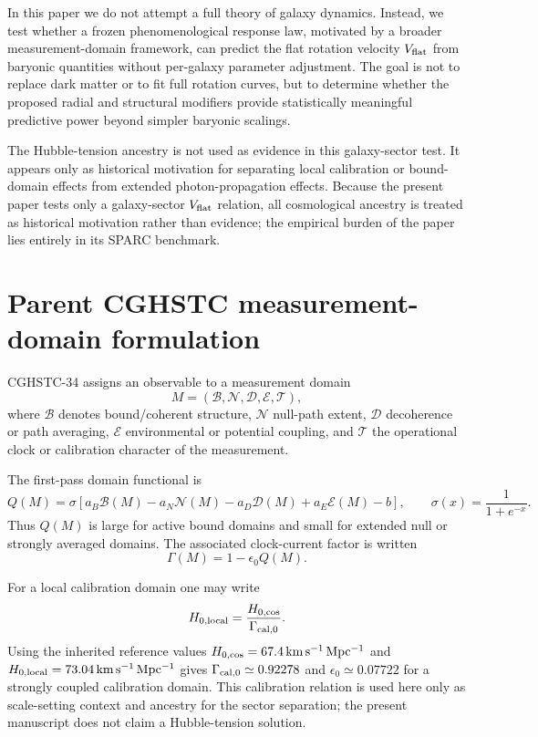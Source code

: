 \documentclass[aps,prd,preprint,nofootinbib,superscriptaddress]{revtex4-2}
\begin{document}
In this paper we do not attempt a full theory of galaxy dynamics. Instead, we test whether a frozen phenomenological response law, motivated by a broader measurement-domain framework, can predict the flat rotation velocity $V_{\rm flat}$ from baryonic quantities without per-galaxy parameter adjustment. The goal is not to replace dark matter or to fit full rotation curves, but to determine whether the proposed radial and structural modifiers provide statistically meaningful predictive power beyond simpler baryonic scalings.

The Hubble-tension ancestry is not used as evidence in this galaxy-sector test. It appears only as historical motivation for separating local calibration or bound-domain effects from extended photon-propagation effects. Because the present paper tests only a galaxy-sector $V_{\rm flat}$ relation, all cosmological ancestry is treated as historical motivation rather than evidence; the empirical burden of the paper lies entirely in its SPARC benchmark.

\section{Parent CGHSTC measurement-domain formulation}

CGHSTC-34 assigns an observable to a measurement domain
\begin{equation}
M = (\mathcal{B},\mathcal{N},\mathcal{D},\mathcal{E},\mathcal{T}),
\end{equation}
where $\mathcal{B}$ denotes bound/coherent structure, $\mathcal{N}$ null-path extent, $\mathcal{D}$ decoherence or path averaging, $\mathcal{E}$ environmental or potential coupling, and $\mathcal{T}$ the operational clock or calibration character of the measurement.

The first-pass domain functional is
\begin{equation}
Q(M)=\sigma\!\left[
 a_B\mathcal{B}(M)
-a_N\mathcal{N}(M)
-a_D\mathcal{D}(M)
+a_E\mathcal{E}(M)-b
\right],
\qquad
\sigma(x)=\frac{1}{1+e^{-x}} .
\end{equation}
Thus $Q(M)$ is large for active bound domains and small for extended null or strongly averaged domains. The associated clock-current factor is written
\begin{equation}
\Gamma(M)=1-\epsilon_0 Q(M).
\end{equation}

For a local calibration domain one may write
\begin{equation}
H_{0,\rm local}=\frac{H_{0,\rm cos}}{\Gamma_{\rm cal,0}}.
\end{equation}
Using the inherited reference values $H_{0,\rm cos}=67.4\,{\rm km\,s^{-1}\,Mpc^{-1}}$ and $H_{0,\rm local}=73.04\,{\rm km\,s^{-1}\,Mpc^{-1}}$ gives $\Gamma_{\rm cal,0}\simeq0.92278$ and $\epsilon_0\simeq0.07722$ for a strongly coupled calibration domain. This calibration relation is used here only as scale-setting context and ancestry for the sector separation; the present manuscript does not claim a Hubble-tension solution.
\end{document}
